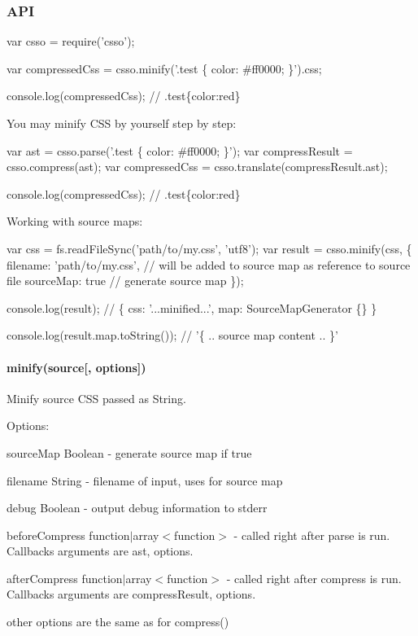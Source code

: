 \subsubsection*{A\+PI}


\begin{DoxyCode}
var csso = require('csso');

var compressedCss = csso.minify('.test \{ color: #ff0000; \}').css;

console.log(compressedCss);
// .test\{color:red\}
\end{DoxyCode}


You may minify C\+SS by yourself step by step\+:


\begin{DoxyCode}
var ast = csso.parse('.test \{ color: #ff0000; \}');
var compressResult = csso.compress(ast);
var compressedCss = csso.translate(compressResult.ast);

console.log(compressedCss);
// .test\{color:red\}
\end{DoxyCode}


Working with source maps\+:


\begin{DoxyCode}
var css = fs.readFileSync('path/to/my.css', 'utf8');
var result = csso.minify(css, \{
  filename: 'path/to/my.css', // will be added to source map as reference to source file
  sourceMap: true             // generate source map
\});

console.log(result);
// \{ css: '...minified...', map: SourceMapGenerator \{\} \}

console.log(result.map.toString());
// '\{ .. source map content .. \}'
\end{DoxyCode}


\paragraph*{minify(source\mbox{[}, options\mbox{]})}

Minify {\ttfamily source} C\+SS passed as {\ttfamily String}.

Options\+:


\begin{DoxyItemize}
\item source\+Map {\ttfamily Boolean} -\/ generate source map if {\ttfamily true}
\item filename {\ttfamily String} -\/ filename of input, uses for source map
\item debug {\ttfamily Boolean} -\/ output debug information to {\ttfamily stderr}
\item before\+Compress {\ttfamily function$\vert$array$<$function$>$} -\/ called right after parse is run. Callbacks arguments are {\ttfamily ast, options}.
\item after\+Compress {\ttfamily function$\vert$array$<$function$>$} -\/ called right after compress is run. Callbacks arguments are {\ttfamily compress\+Result, options}.
\item other options are the same as for {\ttfamily compress()}
\end{DoxyItemize}

